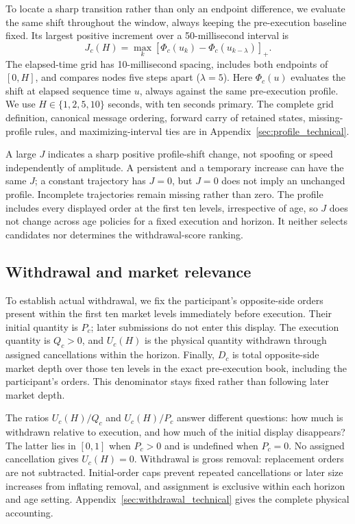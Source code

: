 To locate a sharp transition rather than only an endpoint difference, we evaluate the same shift throughout the window, always keeping the pre-execution baseline fixed. Its largest positive increment over a 50-millisecond interval is
\begin{equation}
    J_c(H)=\max_k\left[\Phi_c(u_k)-\Phi_c(u_{k-\lambda})\right]_+.
    \label{eq:msci_grid_increment}
\end{equation}
The elapsed-time grid has 10-millisecond spacing, includes both endpoints of $[0,H]$, and compares nodes five steps apart ($\lambda=5$). Here $\Phi_c(u)$ evaluates the shift at elapsed sequence time $u$, always against the same pre-execution profile. We use $H\in\{1,2,5,10\}$ seconds, with ten seconds primary. The complete grid definition, canonical message ordering, forward carry of retained states, missing-profile rules, and maximizing-interval ties are in Appendix~\ref{sec:profile_technical}.

A large $J$ indicates a sharp positive profile-shift change, not spoofing or speed independently of amplitude. A persistent and a temporary increase can have the same $J$; a constant trajectory has $J=0$, but $J=0$ does not imply an unchanged profile. Incomplete trajectories remain missing rather than zero. The profile includes every displayed order at the first ten levels, irrespective of age, so $J$ does not change across age policies for a fixed execution and horizon. It neither selects candidates nor determines the withdrawal-score ranking.

\subsection{Withdrawal and market relevance}
\label{subsec:withdrawal_market_age}
To establish actual withdrawal, we fix the participant's opposite-side orders present within the first ten market levels immediately before execution. Their initial quantity is $P_c$; later submissions do not enter this display. The execution quantity is $Q_c>0$, and $U_c(H)$ is the physical quantity withdrawn through assigned cancellations within the horizon. Finally, $D_c$ is total opposite-side market depth over those ten levels in the exact pre-execution book, including the participant's orders. This denominator stays fixed rather than following later market depth.

The ratios $U_c(H)/Q_c$ and $U_c(H)/P_c$ answer different questions: how much is withdrawn relative to execution, and how much of the initial display disappears? The latter lies in $[0,1]$ when $P_c>0$ and is undefined when $P_c=0$. No assigned cancellation gives $U_c(H)=0$. Withdrawal is gross removal: replacement orders are not subtracted. Initial-order caps prevent repeated cancellations or later size increases from inflating removal, and assignment is exclusive within each horizon and age setting. Appendix~\ref{sec:withdrawal_technical} gives the complete physical accounting.

